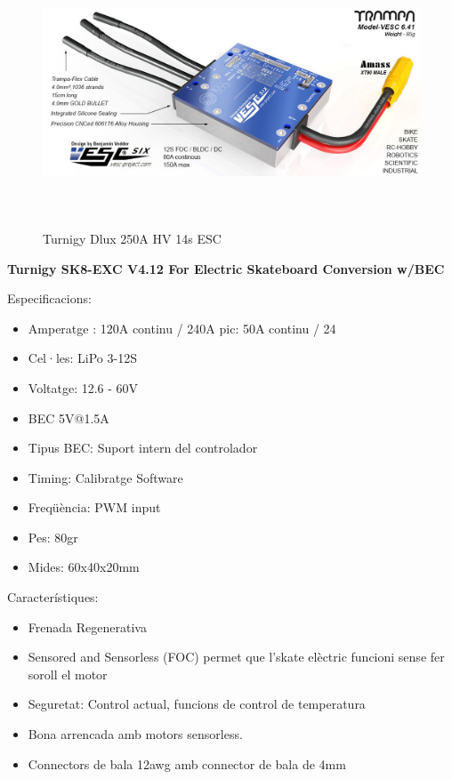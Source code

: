 \begin{figure}[H]
	\centering
	\includegraphics[width=\textwidth, height=8cm]{Marcteoric/drivertrampavesc6.jpg}
 	\caption{Turnigy Dlux 250A HV 14s ESC} 
\end{figure}




\textbf{Turnigy SK8-EXC V4.12 For Electric Skateboard Conversion w/BEC}


Especificacions: 	
\begin{itemize}
    \item Amperatge : 120A continu / 240A pic: 50A continu / 24            
	\item Cel·les: LiPo 3-12S
    \item Voltatge: 12.6 - 60V
    \item BEC 5V@1.5A
    \item Tipus BEC: Suport intern del controlador
    \item Timing: Calibratge Software
    \item Freqüència: PWM input
    \item Pes: 80gr
	\item Mides: 60x40x20mm
\end{itemize}

Característiques:
\begin{itemize}
	\item Frenada Regenerativa
	\item Sensored and Sensorless (FOC) permet que l'skate elèctric funcioni sense fer soroll el motor
	\item Seguretat: Control actual, funcions de control de temperatura
	\item Bona arrencada amb motors sensorless.
	\item Connectors de bala 12awg amb connector de bala de  4mm
\end{itemize}

